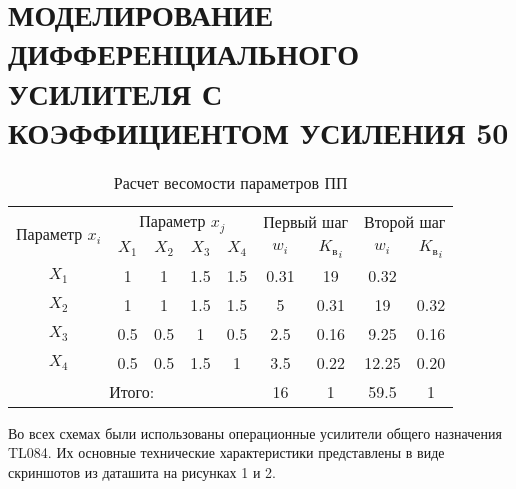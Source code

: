 \begin{sloppypar} %
\newpage %

\section{МОДЕЛИРОВАНИЕ ДИФФЕРЕНЦИАЛЬНОГО УСИЛИТЕЛЯ С КОЭФФИЦИЕНТОМ УСИЛЕНИЯ 50} %



\begin{table}[ht]
\caption{Расчет весомости параметров ПП}
\label{tab_weight}
\centering
    \begin{tabular}{|c|c|c|c|c|c|c|c|c|}
    \hline \multirow{2}{*}{Параметр $x_i$} & \multicolumn{4}{c|}{Параметр $x_j$} & 
        \multicolumn{2}{c|}{Первый шаг} & \multicolumn{2}{c|}{Второй шаг} \\
    \cline{2-9} & $X_1$ & $X_2$ & $X_3$ & $X_4$ & $w_i$ & 
        ${K_\text{в}}_i$ & $w_i$ & ${K_\text{в}}_i$ \\
    \hline $X_1$ & 1 & 1 & 1.5 & 1.5 &  0.31 & 19 & 0.32 \\
    \hline $X_2$ & 1 & 1 & 1.5 & 1.5 & 5 & 0.31 & 19 & 0.32 \\
    \hline $X_3$ & 0.5 & 0.5 & 1 & 0.5 & 2.5 & 0.16 & 9.25 & 0.16 \\
    \hline $X_4$ & 0.5 & 0.5 & 1.5 & 1 & 3.5 & 0.22 & 12.25 & 0.20 \\
    \hline \multicolumn{5}{|c|}{Итого:} & 16 & 1 & 59.5 & 1 \\
    \hline
    \end{tabular}
\end{table}





Во всех схемах были использованы операционные усилители общего назначения TL084. Их основные технические характеристики представлены в виде скриншотов из даташита на рисунках 1 и 2. 


\end{sloppypar}
